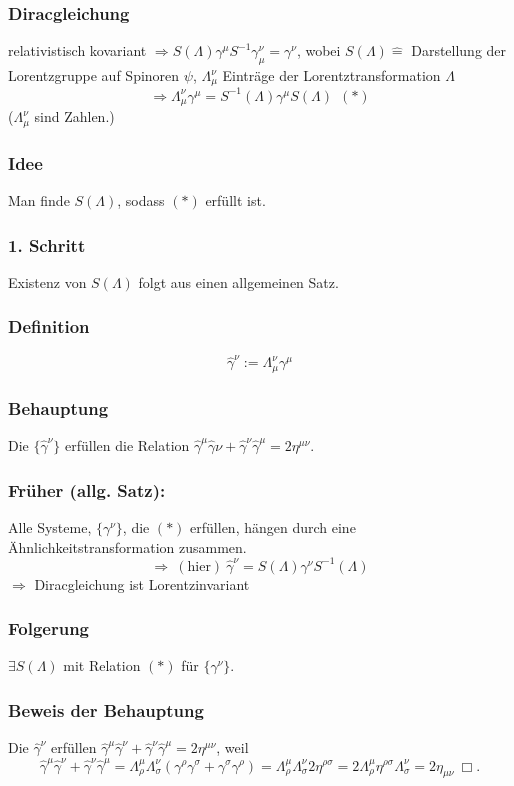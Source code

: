 \documentclass[twoside,a4paper]{scrartcl}
\renewcommand{\1}{\mathds{1}}
\newcommand{\Ra}{\Rightarrow}
\newcommand{\entspricht}{\mathrel{\widehat{=}}}
\renewcommand{\L}{\Lambda}
\begin{document}
\subsubsection*{Diracgleichung}
relativistisch kovariant $\Ra S(\L) \gamma^\mu S^{-1} \gamma_\mu^\nu=\gamma^\nu$, wobei $S(\L) \entspricht$ Darstellung der Lorentzgruppe auf Spinoren $\psi$, $\L^\nu_\mu$ Einträge der Lorentztransformation $\L$
$$\Ra \L^\nu_\mu\gamma^\mu=S^{-1}(\L) \gamma^\mu S(\L) \ \ (*)$$ 
($\L^\nu_\mu$ sind Zahlen.)
\subsubsection*{Idee}
Man finde $S(\L)$, sodass $(*)$ erfüllt ist.
\subsubsection*{1. Schritt}
Existenz von $S(\L)$ folgt aus einen allgemeinen Satz.
\subsubsection*{Definition}
$$\hat \gamma^\nu:= \L_\mu^\nu \gamma^\mu$$
\subsubsection*{Behauptung}
Die $\{\hat \gamma^\nu \}$ erfüllen die Relation $\hat\gamma^\mu\hat\gamma\nu+\hat \gamma^\nu\hat \gamma^\mu=2 \eta^{\mu\nu}$.
\subsubsection*{Früher (allg. Satz):}
Alle Systeme, $\{\gamma^\nu\}$, die $(*)$ erfüllen, hängen durch eine Ähnlichkeitstransformation zusammen.\\
$$\Ra \ \mathrm{(hier)} \ \hat \gamma^\nu=S(\L) \gamma^\nu S^{-1}(\L)$$
$\Ra$ Diracgleichung ist Lorentzinvariant
\subsubsection*{Folgerung}
$\exists S(\L)$ mit Relation $(*)$ für $\{\gamma^\nu\}$.
\subsubsection*{Beweis der Behauptung}
Die $\hat \gamma^\nu$ erfüllen $\hat \gamma^\mu \hat \gamma^\nu+\hat \gamma^\nu \hat \gamma^\mu=2 \eta^{\mu\nu} $, weil 
$$\hat \gamma^\mu \hat \gamma^\nu+\hat \gamma^\nu \hat \gamma^\mu=\L^\mu_\rho \L_\sigma^\nu(\gamma^\rho\gamma^\sigma+\gamma^\sigma\gamma^\rho)=\L_\rho^\mu \L^\nu_\sigma 2 \eta^{\rho\sigma}=2\L_\rho^\mu \eta^{\rho\sigma}\L^\nu_\sigma =2\eta_{\mu\nu} \ \Box.$$
\end{document}
